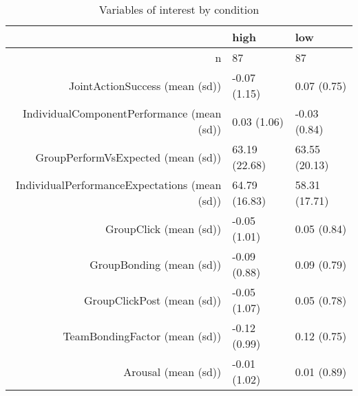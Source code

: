 \begin{table}[ht]
\centering
\begin{tabular}{rll}
  \hline
 & high & low \\ 
  \hline
n &    87 &    87 \\ 
  JointActionSuccess (mean (sd)) & -0.07 (1.15) &  0.07 (0.75) \\ 
  IndividualComponentPerformance (mean (sd)) &  0.03 (1.06) & -0.03 (0.84) \\ 
  GroupPerformVsExpected (mean (sd)) & 63.19 (22.68) & 63.55 (20.13) \\ 
  IndividualPerformanceExpectations (mean (sd)) & 64.79 (16.83) & 58.31 (17.71) \\ 
  GroupClick (mean (sd)) & -0.05 (1.01) &  0.05 (0.84) \\ 
  GroupBonding (mean (sd)) & -0.09 (0.88) &  0.09 (0.79) \\ 
  GroupClickPost (mean (sd)) & -0.05 (1.07) &  0.05 (0.78) \\ 
  TeamBondingFactor (mean (sd)) & -0.12 (0.99) &  0.12 (0.75) \\ 
  Arousal (mean (sd)) & -0.01 (1.02) &  0.01 (0.89) \\ 
   \hline
\end{tabular}
\caption{Variables of interest 
 by condition} 
\label{tab:factorsTimeLow}
\end{table}
